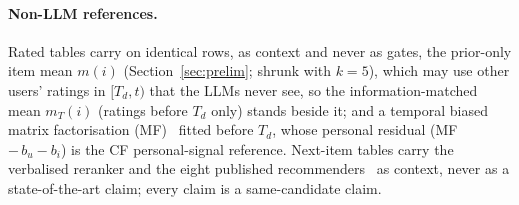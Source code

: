 \paragraph{Non-LLM references.}
Rated tables carry on identical rows, as context and never as gates, the prior-only item mean $m(i)$ (Section~\ref{sec:prelim};
shrunk with $k=5$), which may use other users' ratings in $[T_d,t)$ that the LLMs never see, so the information-matched mean $m_T(i)$
(ratings before $T_d$ only) stands beside it; and a temporal biased matrix factorisation (MF)~\citep{koren2009matrix}
fitted before $T_d$, whose personal residual (MF $-\,b_u-b_i$) is the CF personal-signal reference. Next-item tables carry the
verbalised reranker and the eight published
recommenders~\citep{wang2024elmrec,wang2025irllrec,he2025llm2rec,liu2025llmemb,liu2024llmesr,zhang2026proex,zhang2026promax,ren2024rlmrec}
as context, never as a state-of-the-art claim; every claim is a same-candidate claim.

